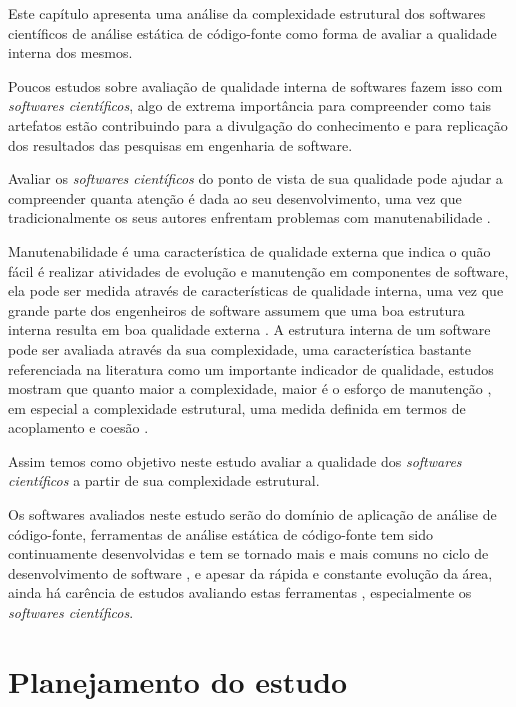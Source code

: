{Este capítulo apresenta uma análise da complexidade estrutural dos softwares
científicos de análise estática de código-fonte como forma de avaliar a qualidade
interna dos mesmos.}
\label{complexidade-ferramentas}

Poucos estudos sobre avaliação de qualidade interna de softwares fazem isso com
{\it softwares científicos}, algo de extrema importância para compreender como
tais artefatos estão contribuindo para a divulgação do conhecimento e para
replicação dos resultados das pesquisas em engenharia de software.

Avaliar os {\it softwares científicos} do ponto de vista de sua qualidade pode
ajudar a compreender quanta atenção é dada ao seu desenvolvimento, uma vez que
tradicionalmente os seus autores enfrentam problemas com manutenabilidade
\cite{Prlic2012}.

Manutenabilidade é uma característica de qualidade externa que indica o quão
fácil é realizar atividades de evolução e manutenção em componentes de
software, ela pode ser medida através de características de qualidade interna,
uma vez que grande parte dos engenheiros de software assumem que uma boa
estrutura interna resulta em boa qualidade externa \cite{Fenton2014}. A
estrutura interna de um software pode ser avaliada através da sua complexidade,
uma característica bastante referenciada na literatura como um importante
indicador de qualidade, estudos mostram que quanto maior a complexidade, maior
é o esforço de manutenção \cite{hashim1996software, Darcy2005}, em especial a
complexidade estrutural, uma medida definida em termos de acoplamento e coesão
\cite{Terceiro2012}.

Assim temos como objetivo neste estudo avaliar a qualidade dos {\it softwares
científicos} a partir de sua complexidade estrutural.

Os softwares avaliados neste estudo serão do domínio de aplicação de análise de
código-fonte, ferramentas de análise estática de código-fonte tem sido
continuamente desenvolvidas e tem se tornado mais e mais comuns no ciclo de
desenvolvimento de software \cite{Novak2010}, e apesar da rápida e constante
evolução da área, ainda há carência de estudos avaliando estas ferramentas
\cite{Li2010}, especialmente os {\it softwares científicos}.

\section{Planejamento do estudo}

